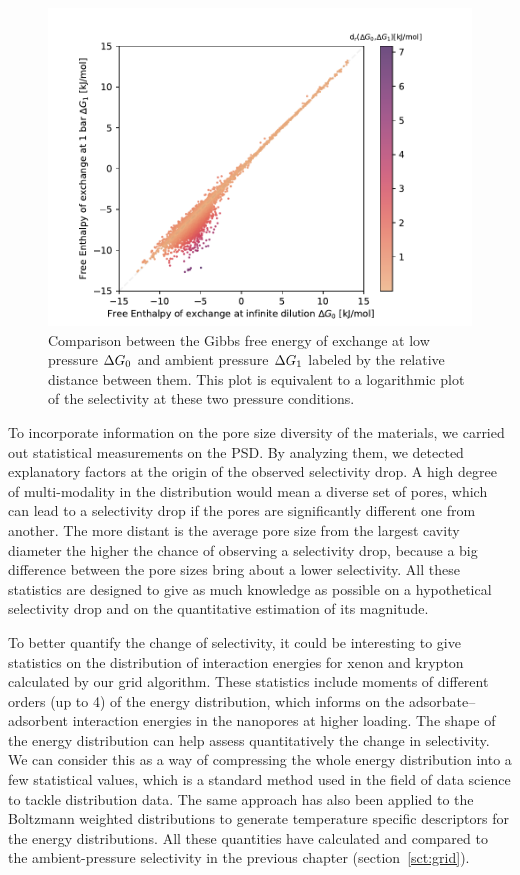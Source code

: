\documentclass[main]{subfiles}
\begin{document}
\begin{figure}[ht]
\centering
  \includegraphics[width=0.5\linewidth]{figures/4-ml/main/Scatterplot_G1_G0.pdf}
  \caption{Comparison between the Gibbs free energy of exchange at low pressure $\Delta G_{\text{0}}$ and ambient pressure $\Delta G_{\text{1}}$ labeled by the relative distance between them. This plot is equivalent to a logarithmic plot of the selectivity at these two pressure conditions.}
  \label{fgr:problem}
\end{figure}

To incorporate information on the pore size diversity of the materials, we carried out statistical measurements on the PSD. By analyzing them, we detected explanatory factors at the origin of the observed selectivity drop. A high degree of multi-modality in the distribution would mean a diverse set of pores, which can lead to a selectivity drop if the pores are significantly different one from another. The more distant is the average pore size from the largest cavity diameter the higher the chance of observing a selectivity drop, because a big difference between the pore sizes bring about a lower selectivity. All these statistics are designed to give as much knowledge as possible on a hypothetical selectivity drop and on the quantitative estimation of its magnitude.

To better quantify the change of selectivity, it could be interesting to give statistics on the distribution of interaction energies for xenon and krypton calculated by our grid algorithm. These statistics include moments of different orders (up to 4) of the energy distribution, which informs on the adsorbate--adsorbent interaction energies in the nanopores at higher loading. The shape of the energy distribution can help assess quantitatively the change in selectivity. We can consider this as a way of compressing the whole energy distribution into a few statistical values, which is a standard method used in the field of data science to tackle distribution data. The same approach has also been applied to the Boltzmann weighted distributions to generate temperature specific descriptors for the energy distributions. All these quantities have calculated and compared to the ambient-pressure selectivity in the previous chapter (section~\ref{sct:grid}).
\end{document}
